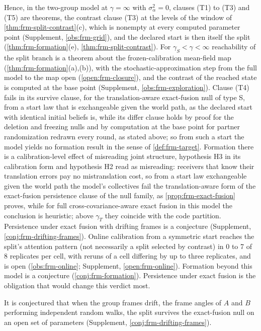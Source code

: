 Hence, in the two-group model at $\gamma=\infty$ with $\sigma_\alpha^2=0$, clauses (T1) to (T3) and (T5) are theorems, the contrast clause (T3) at the levels of the window of \cref{thm:frm-split-contrast}(c), which is nonempty at every computed parameter point (Supplement, \cref{obs:frm-grid}), and the declared start is then itself the split (\cref{thm:frm-formation}(e), \cref{thm:frm-split-contrast}). For $\gamma_S<\gamma<\infty$ reachability of the split branch is a theorem about the frozen-calibration mean-field map (\cref{thm:frm-formation}(a),(b)), with the stochastic-approximation step from the full model to the map open (\cref{open:frm-closure}), and the contrast of the reached state is computed at the base point (Supplement, \cref{obs:frm-exploration}). Clause (T4) fails in its survive clause, for the translation-aware exact-fusion null of type S, from a start law that is exchangeable given the world path, as the declared start with identical initial beliefs is, while its differ clause holds by proof for the deletion and freezing nulls and by computation at the base point for partner randomization redrawn every round, as stated above; so from such a start the model yields no formation result in the sense of \cref{def:frm-target}. Formation there is a calibration-level effect of misreading joint structure, hypothesis H3 in its calibration form and hypothesis H2 read as misreading: receivers that know their translation errors pay no mistranslation cost, so from a start law exchangeable given the world path the model's collectives fail the translation-aware form of the exact-fusion persistence clause of the null family, as \cref{prop:frm-exact-fusion} proves, while for full cross-covariance-aware exact fusion in this model the conclusion is heuristic; above $\gamma_T$ they coincide with the code partition. Persistence under exact fusion with drifting frames is a conjecture (Supplement, \cref{conj:frm-drifting-frames}). Online calibration from a symmetric start reaches the split's attention pattern (not necessarily a split selected by contrast) in 0 to 7 of 8 replicates per cell, with reruns of a cell differing by up to three replicates, and is open (\cref{obs:frm-online}; Supplement, \cref{open:frm-online}). Formation beyond this model is a conjecture (\cref{conj:frm-formation}). Persistence under exact fusion is the obligation that would change this verdict most.

It is conjectured that when the group frames drift, the frame angles of $A$ and $B$ performing independent random walks, the split survives the exact-fusion null on an open set of parameters (Supplement, \cref{conj:frm-drifting-frames}).

